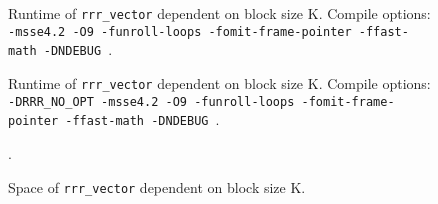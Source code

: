\documentclass[9pt,a4paper]{scrartcl}
\begin{document}
\pagestyle{empty} \begin{figure}
               
               \caption{Runtime of \texttt{rrr\_vector} dependent on block size K.
			   Compile options:
			   \texttt{ -msse4.2 -O9 -funroll-loops -fomit-frame-pointer -ffast-math -DNDEBUG }.
			   }
              \end{figure} \begin{figure}
               
               \caption{Runtime of \texttt{rrr\_vector} dependent on block size K.
			   Compile options:
			   \texttt{ -DRRR\_NO\_OPT -msse4.2 -O9 -funroll-loops -fomit-frame-pointer -ffast-math -DNDEBUG }.
			   }
              \end{figure} \begin{figure}
                 
                 \caption{Space of \texttt{rrr\_vector} dependent on block size K.}.
                 \end{figure} 
\end{document}
